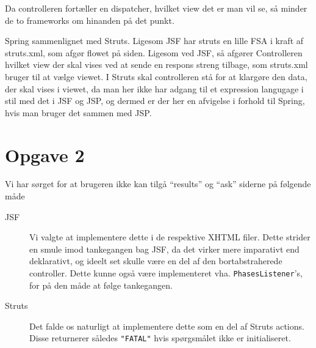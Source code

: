 \documentclass[a4paper,10pt]{article}
\begin{document}
Da controlleren fortæller en dispatcher, hvilket view det er man vil se, så minder de to frameworks om hinanden på det punkt.

Spring sammenlignet med Struts.
Ligesom JSF har struts en lille FSA i kraft af struts.xml, som afgør flowet på siden. Ligesom ved JSF, så afgører Controlleren hvilket view der skal vises ved at sende en respons streng tilbage, som struts.xml bruger til at vælge viewet. I Struts skal controlleren stå for at klargøre den data, der skal vises i viewet, da man her ikke har adgang til et expression langugage i stil med det i JSF og JSP, og dermed er der her en afvigelse i forhold til Spring, hvis man bruger det sammen med JSP.


\section*{Opgave 2}

Vi har sørget for at brugeren ikke kan tilgå ``results'' og ``ask'' siderne på følgende måde
\begin{description}
\item[JSF] Vi valgte at implementere dette i de respektive XHTML filer. Dette strider en smule imod tankegangen bag JSF, da det virker mere imparativt end deklarativt, og ideelt set skulle være en del af den bortabstraherede controller. Dette kunne også være implementeret vha. \texttt{PhasesListener}'s, for på den måde at følge tankegangen. 
\item[Struts] Det falde os naturligt at implementere dette som en del af Struts actions. Disse returnerer således \texttt{"FATAL"} hvis spørgsmålet ikke er initialiseret. 
\end{description}
\end{document}

